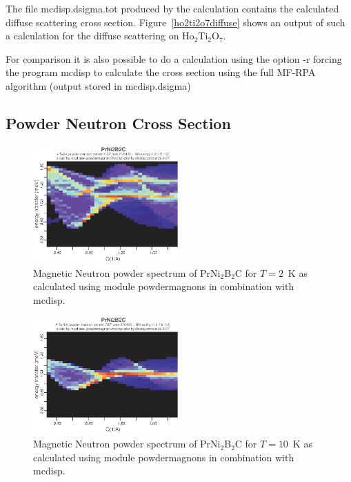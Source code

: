 The file {\prg mcdisp.dsigma.tot} produced by the calculation contains the calculated diffuse scattering cross section.
Figure~\ref{ho2ti2o7diffuse} shows an output of such a calculation for the diffuse scattering
on Ho$_2$Ti$_2$O$_7$.

For comparison it is also possible to do a calculation using the option {\prg -r} forcing
 the program {\prg mcdisp} to calculate the cross section
 using the full MF-RPA algorithm (output stored in {\prg mcdisp.dsigma})

\subsection{Powder Neutron Cross Section}


\begin{figure}[tb]%
\begin{center}\leavevmode
\includegraphics[angle=0, width=0.5\textwidth]{figsrc/contour2K_070504.eps}
\end{center}
\caption{Magnetic Neutron powder spectrum of PrNi$_2$B$_2$C for $T=2$~K as calculated using module {\prg powdermagnons} %
in combination with {\prg 
mcdisp}.}\label{prni2b2c_2K}
\end{figure}

\begin{figure}[tb]%
\begin{center}\leavevmode
\includegraphics[angle=0, width=0.5\textwidth]{figsrc/contour10K_070504.eps}
\end{center}
\caption{Magnetic Neutron powder spectrum of PrNi$_2$B$_2$C for $T=10$~K  as calculated using module {\prg %
powdermagnons} in combination with {\prg 
mcdisp}.}\label{prni2b2c_10K}
\end{figure}

